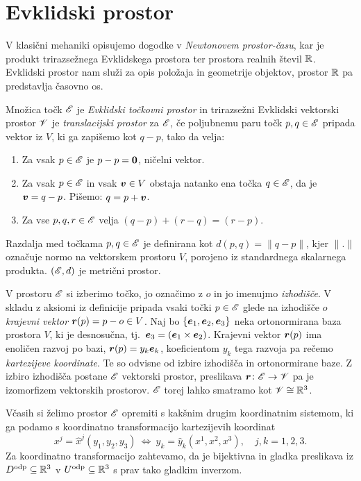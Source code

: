 \section{Evklidski prostor}


V klasični mehaniki opisujemo dogodke v \emph{Newtonovem prostor-času}, kar je produkt
trirazsežnega Evklidskega prostora ter prostora realnih števil $\mathbb R$. Evklidski prostor nam služi
za opis položaja in geometrije objektov, prostor $\mathbb R$ pa predstavlja časovno os.

\begin{definicija} \label{d:ep}
	Množica točk $\mathscr E$ je \emph{Evklidski točkovni prostor} in trirazsežni Evklidski vektorski prostor $\mathscr V$ je
	\emph{translacijski prostor} za $\mathscr E$, če poljubnemu paru točk $p,q\in\mathscr E$ pripada vektor iz $V$,
	ki ga zapišemo kot $q-p$, tako da velja:
	\begin{enumerate}
		\item Za vsak $p\in\mathscr E$ je $p-p=\boldsymbol 0$, ničelni vektor.
		\item Za vsak $p\in\mathscr E$ in vsak $\boldsymbol v\in V$ obstaja natanko ena točka $q\in\mathscr E$, da je
		$\boldsymbol v=q-p$. Pišemo: $q=p+\boldsymbol v$.
		\item Za vse $p,q,r\in\mathscr E$ velja $(q-p)+(r-q)=(r-p)$.
	\end{enumerate}
\end{definicija}

Razdalja med točkama $p,q\in\mathscr E$ je definirana kot $d(p,q)=\|q-p\|$, kjer $\|.\|$ označuje normo na
vektorskem prostoru $V$, porojeno iz standardnega skalarnega produkta. $(\mathscr E,d)$ je metrični prostor.

V prostoru $\mathscr E$ si izberimo točko, jo označimo z $o$ in jo imenujmo \emph{izhodišče}.
V skladu z aksiomi iz definicije pripada vsaki točki $p\in\mathscr E$ glede na izhodišče $o$ \emph{krajevni vektor}
$\boldsymbol r(p)=p-o\in V$. Naj bo $\{\boldsymbol e_1,\boldsymbol e_2,\boldsymbol e_3\}$ neka ortonormirana baza prostora $V$,
ki je desnosučna, tj.~$\boldsymbol e_3=(\boldsymbol e_1\times\boldsymbol e_2)$. Krajevni vektor $\boldsymbol r(p)$
ima enoličen razvoj po bazi, $\boldsymbol r(p)=y_k\boldsymbol e_k$, koeficientom $y_k$ tega razvoja pa rečemo
\emph{kartezijeve koordinate}. Te so odvisne od izbire izhodišča in ortonormirane baze.
Z izbiro izhodišča postane $\mathscr E$ vektorski prostor, preslikava $\boldsymbol r\colon\mathscr E\to\mathscr V$ pa je izomorfizem
vektorskih prostorov. $\mathscr E$ torej lahko smatramo kot $\mathscr V\cong\mathbb R^3$.

Včasih si želimo prostor $\mathscr E$ opremiti s kakšnim drugim koordinatnim sistemom, ki ga podamo
s koordinatno transformacijo kartezijevih koordinat
\begin{equation}\label{e:kt}
	x^j = \hat{x}^j(y_1,y_2,y_3) \ \Leftrightarrow \ y_k=\hat{y}_k(x^1,x^2,x^3), \quad j,k=1,2,3.
\end{equation}
Za koordinatno transformacijo zahtevamo, da je bijektivna in gladka preslikava iz
$D^{\mathrm{odp}}\subseteq\mathbb R^3$ v $U^{\mathrm{odp}}\subseteq\mathbb R^3$ s prav tako gladkim inverzom.

